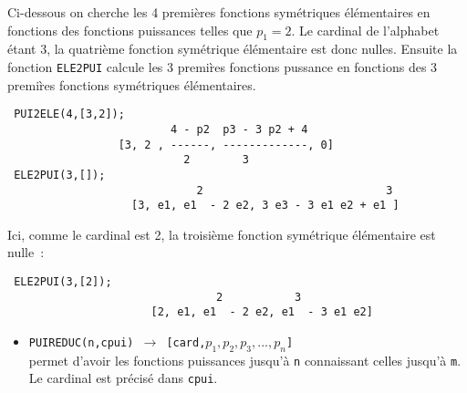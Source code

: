 Ci-dessous on cherche les 4 premi\`eres fonctions sym\'etriques 
\'el\'ementaires en fonctions des fonctions puissances telles
que $p_1=2$. Le cardinal
de l'alphabet \'etant 3, la quatri\`eme fonction sym\'etrique
\'el\'ementaire est donc nulles. Ensuite la fonction {\tt ELE2PUI}
calcule les 3 premi\`res fonctions pussance en fonctions des 3 premi\`res 
fonctions sym\'etriques \'el\'ementaires.
\small
\begin{verbatim}
 PUI2ELE(4,[3,2]);
                         4 - p2  p3 - 3 p2 + 4
                 [3, 2 , ------, -------------, 0]
                           2        3   
 ELE2PUI(3,[]);
                             2                            3
                   [3, e1, e1  - 2 e2, 3 e3 - 3 e1 e2 + e1 ]
\end{verbatim}
\normalsize
Ici, comme le cardinal est 2, la troisi\`{e}me fonction sym\'{e}trique
\'{e}l\'{e}mentaire est nulle~:
\small
\begin{verbatim}
 ELE2PUI(3,[2]);
                                2           3
                      [2, e1, e1  - 2 e2, e1  - 3 e1 e2]
\end{verbatim}
\normalsize
\begin{itemize}
\item {\tt PUIREDUC(n,cpui) 
$\longrightarrow$ [card,$p_{1},p_{2},p_{3},...,p_{n}$]}\\ 
permet d'avoir 
les fonctions puissances jusqu'\`{a} {\tt n} connaissant celles jusqu'\`{a} 
{\tt m}. Le cardinal est pr\'{e}cis\'{e} dans {\tt cpui}.
\end{itemize}

